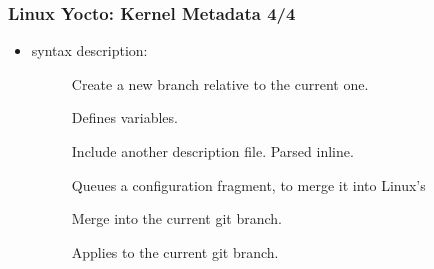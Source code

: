 \begin{frame}
  \frametitle{Linux Yocto: Kernel Metadata 4/4}
  \begin{itemize}
    \item {} syntax description:
      \begin{description}
        \item[] Create a new branch relative to the
          current one.
        \item[] Defines variables.
        \item[] Include another description
          file. Parsed inline.
        \item[] Queues
          a configuration fragment, to merge it into Linux's
        \item[] Merge  into the
          current git branch.
        \item[] Applies  to
          the current git branch.
      \end{description}
  \end{itemize}
\end{frame}
